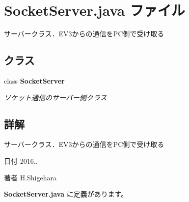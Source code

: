 \section{Socket\-Server.\-java ファイル}
\label{_socket_server_8java}


サーバークラス．\-E\-V3からの通信を\-P\-C側で受け取る  


\subsection*{クラス}
\begin{DoxyCompactItemize}
\item 
class {\bf Socket\-Server}
\begin{DoxyCompactList}\small\item\em ソケット通信のサーバー側クラス \end{DoxyCompactList}\end{DoxyCompactItemize}


\subsection{詳解}
サーバークラス．\-E\-V3からの通信を\-P\-C側で受け取る \begin{DoxyDate}{日付}
2016.. 
\end{DoxyDate}
\begin{DoxyAuthor}{著者}
H.\-Shigehara 
\end{DoxyAuthor}


 {\bf Socket\-Server.\-java} に定義があります。

